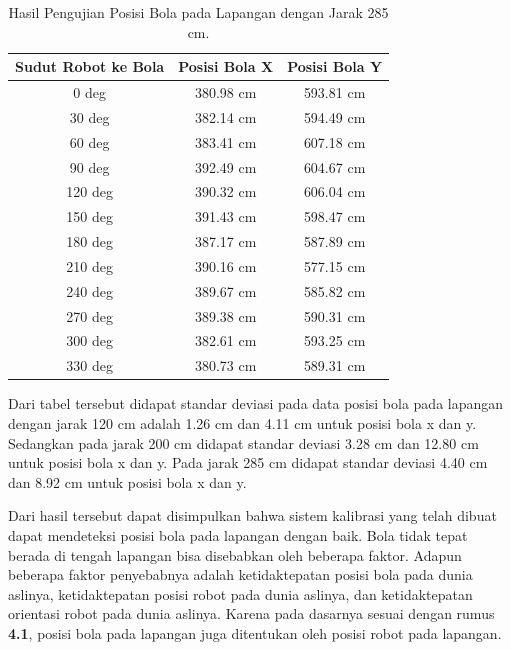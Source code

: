 \begin{table}[htbp]
\caption{Hasil Pengujian Posisi Bola pada Lapangan dengan Jarak 285 cm.}
\begin{center}
  
\begin{tabular}{|c|c|c|}
  \hline
  \rowcolor[HTML]{C0C0C0}
  \textbf{Sudut Robot ke Bola} & \textbf{Posisi Bola X} & \textbf{Posisi Bola Y} \\
  \hline
  0 deg            & 380.98 cm                & 593.81 cm            \\
  30 deg           & 382.14 cm                & 594.49 cm            \\
  60 deg           & 383.41 cm                & 607.18 cm            \\
  90 deg           & 392.49 cm                & 604.67 cm           \\
  120 deg           & 390.32 cm                & 606.04 cm           \\
  150 deg           & 391.43 cm                & 598.47 cm           \\
  180 deg           & 387.17 cm                & 587.89 cm           \\
  210 deg           & 390.16 cm                & 577.15 cm           \\
  240 deg           & 389.67 cm                & 585.82 cm           \\
  270 deg           & 389.38 cm                & 590.31 cm           \\
  300 deg           & 382.61 cm                & 593.25 cm           \\
  330 deg           & 380.73 cm                & 589.31 cm           \\
  \hline
\end{tabular}
\end{center}
\end{table}


Dari tabel tersebut didapat standar deviasi pada data posisi bola pada lapangan dengan jarak 120 cm adalah 1.26 cm dan 4.11 cm untuk posisi bola x dan y. Sedangkan pada jarak 200 cm didapat standar deviasi 3.28 cm dan 12.80 cm untuk posisi bola x dan y. Pada jarak 285 cm didapat standar deviasi 4.40 cm dan 8.92 cm untuk posisi bola x dan y. 

Dari hasil tersebut dapat disimpulkan bahwa sistem kalibrasi yang telah dibuat dapat mendeteksi posisi bola pada lapangan dengan baik. Bola tidak tepat berada di tengah lapangan bisa disebabkan oleh beberapa faktor. Adapun beberapa faktor penyebabnya adalah ketidaktepatan posisi bola pada dunia aslinya, ketidaktepatan posisi robot pada dunia aslinya, dan ketidaktepatan orientasi robot pada dunia aslinya. Karena pada dasarnya sesuai dengan rumus \textbf{4.1}, posisi bola pada lapangan juga ditentukan oleh posisi robot pada lapangan. 

